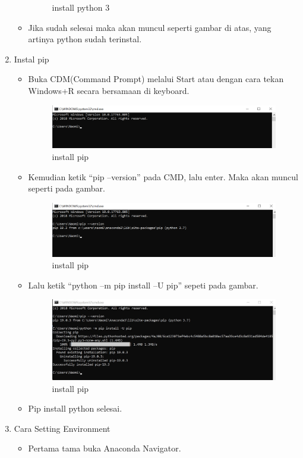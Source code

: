 \begin{enumerate}
\begin{itemize}
\begin{figure}[!htbp]
\caption{install python 3}
\end{figure}
\item Jika sudah selesai maka akan muncul seperti gambar di atas, yang artinya python sudah terinstal.
\end{itemize}
\item Instal pip
\begin{itemize}
\item Buka CDM(Command Prompt) melalui Start atau dengan cara tekan Windows+R secara bersamaan di keyboard.
\begin{figure}[!htbp]
\centering
\includegraphics[width=10cm]{gambar/pip0.png}
\caption{install pip}
\end{figure}
\item Kemudian ketik “pip --version” pada CMD, lalu enter. Maka akan muncul seperti pada gambar.
\begin{figure}[!htbp]
\centering
\includegraphics[width=10cm]{gambar/pip1.png}
\caption{install pip}
\end{figure}
\item Lalu ketik “python –m pip install –U pip” sepeti pada gambar.
\begin{figure}[!htbp]
\centering
\includegraphics[width=10cm]{gambar/pip2.jpg}
\caption{install pip}
\end{figure}
\item Pip install python selesai.
\end{itemize}
\item Cara Setting Environment
\begin{itemize}
\item Pertama tama buka Anaconda Navigator.

\end{itemize}
\end{enumerate}
